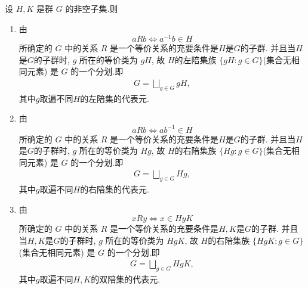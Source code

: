 \documentclass[../../main.tex]{subfiles}%
\begin{document}
\begin{theorem}\label{theorem:抽象代数-定理 1.3.2}
设 \( H ,K\) 是群 \( G \) 的非空子集.则
\begin{enumerate}[(1)]
\item\label{theorem:抽象代数-定理 1.3.2-1} 由
\[
aRb \iff a^{-1}b \in H
\]
所确定的 \( G \) 中的关系 \( R \) 是一个等价关系的充要条件是$H$是$G$的子群. 并且当$H$是$G$的子群时, \( g \) 所在的等价类为 \( gH \), 故 \( H \)的左陪集族 \( \{gH:g\in G\} \)(集合无相同元素) 是 \( G \) 的一个分划.即
\begin{align*}
G = \bigsqcup_{g\in G}gH,
\end{align*}
其中$g$取遍不同$H$的左陪集的代表元.

\item\label{theorem:抽象代数-定理 1.3.2-2} 由
\[
aRb \iff ab^{-1} \in H
\]
所确定的 \( G \) 中的关系 \( R \) 是一个等价关系的充要条件是$H$是$G$的子群. 并且当$H$是$G$的子群时, \( g \) 所在的等价类为 \( Hg \), 故 \( H \)的右陪集族 \( \{Hg:g\in G\} \)(集合无相同元素) 是 \( G \) 的一个分划.即
\begin{align*}
G = \bigsqcup_{g\in G}Hg,
\end{align*}
其中$g$取遍不同$H$的右陪集的代表元.

\item\label{theorem:抽象代数-定理 1.3.2-3} 由
\[
xRy \iff x\in HyK
\]
所确定的 \( G \) 中的关系 \( R \) 是一个等价关系的充要条件是$H,K$是$G$的子群. 并且当$H,K$是$G$的子群时, \( g \) 所在的等价类为 \( HgK \), 故 \( H \)的右陪集族 \( \{HgK:g\in G\} \)(集合无相同元素) 是 \( G \) 的一个分划.即
\begin{align*}
G = \bigsqcup_{g\in G}HgK,
\end{align*}
其中$g$取遍不同$H,K$的双陪集的代表元.
\end{enumerate}
\end{theorem}
\end{document}
